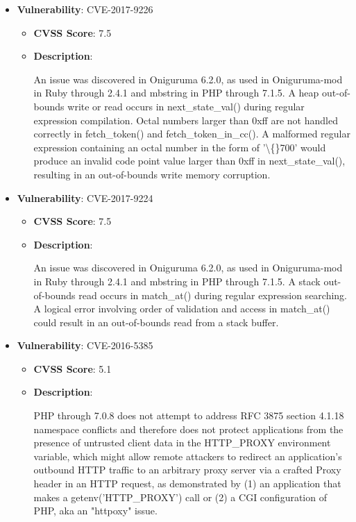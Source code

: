\documentclass{article}
\begin{document}
\begin{itemize}
        \item \textbf{Vulnerability}: CVE-2017-9226
        \begin{itemize}
            \item \textbf{CVSS Score}:  7.5 
            \item \textbf{Description}:
            \parbox[t]{0.9\linewidth}{
                \ttfamily An issue was discovered in Oniguruma 6.2.0, as used in Oniguruma-mod in Ruby through 2.4.1 and mbstring in PHP through 7.1.5. A heap out-of-bounds write or read occurs in next\_state\_val() during regular expression compilation. Octal numbers larger than 0xff are not handled correctly in fetch\_token() and fetch\_token\_in\_cc(). A malformed regular expression containing an octal number in the form of '\textbackslash\{\}700' would produce an invalid code point value larger than 0xff in next\_state\_val(), resulting in an out-of-bounds write memory corruption.
            }
        \end{itemize}
    
        \item \textbf{Vulnerability}: CVE-2017-9224
        \begin{itemize}
            \item \textbf{CVSS Score}:  7.5 
            \item \textbf{Description}:
            \parbox[t]{0.9\linewidth}{
                \ttfamily An issue was discovered in Oniguruma 6.2.0, as used in Oniguruma-mod in Ruby through 2.4.1 and mbstring in PHP through 7.1.5. A stack out-of-bounds read occurs in match\_at() during regular expression searching. A logical error involving order of validation and access in match\_at() could result in an out-of-bounds read from a stack buffer.
            }
        \end{itemize}
    
        \item \textbf{Vulnerability}: CVE-2016-5385
        \begin{itemize}
            \item \textbf{CVSS Score}:  5.1 
            \item \textbf{Description}:
            \parbox[t]{0.9\linewidth}{
                \ttfamily PHP through 7.0.8 does not attempt to address RFC 3875 section 4.1.18 namespace conflicts and therefore does not protect applications from the presence of untrusted client data in the HTTP\_PROXY environment variable, which might allow remote attackers to redirect an application's outbound HTTP traffic to an arbitrary proxy server via a crafted Proxy header in an HTTP request, as demonstrated by (1) an application that makes a getenv('HTTP\_PROXY') call or (2) a CGI configuration of PHP, aka an "httpoxy" issue.
            }
        \end{itemize}
    

\end{itemize}
\end{document}
